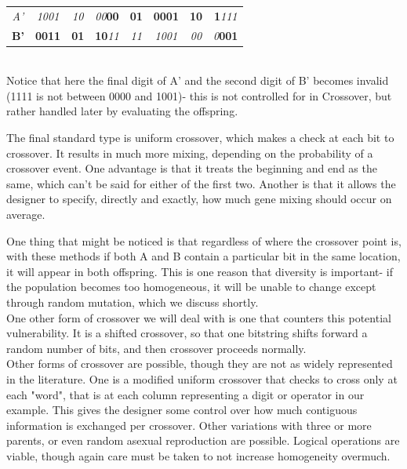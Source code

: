 \begin{tabular}{|c|c|c|c|c|c|c|c|}
	\hline
	\textit{A'} & \textit{1001} & \textit{10} & \textit{00}\textbf{00}  & \textbf{01} & \textbf{0001} & \textbf{10} & \textbf{1}\textit{111}\\ 
	\textbf{B'} & \textbf{0011} & \textbf{01} & \textbf{10}\textit{11} & \textit{11} & \textit{1001} & \textit{00} & \textit{0}\textbf{001}\\
	\hline
\end{tabular}\\

Notice that here the final digit of A' and the second digit of B' becomes invalid (1111 is not between 0000 and 1001)- this is not controlled for in Crossover, but rather handled later by evaluating the offspring.

The final standard type is uniform crossover, which makes a check at each bit to crossover.  It results in much more mixing, depending on the probability of a crossover event.  One advantage is that it treats the beginning and end as the same, which can't be said for either of the first two.  Another is that it allows the designer to specify, directly and exactly, how much gene mixing should occur on average.

One thing that might be noticed is that regardless of where the crossover point is, with these methods if both A and B contain a particular bit in the same location, it will appear in both offspring.  This is one reason that diversity is important- if the population becomes too homogeneous, it will be unable to change except through random mutation, which we discuss shortly.\\
One other form of crossover we will deal with is one that counters this potential vulnerability.  It is a shifted crossover, so that one bitstring shifts forward a random number of bits, and then crossover proceeds normally.
\\
Other forms of crossover are possible, though they are not as widely represented in the literature.  One is a modified uniform crossover that checks to cross only  at each "word", that is at each column representing a digit or operator in our example.  This gives the designer some control over how much contiguous information is exchanged per crossover.  Other variations with three or more parents, or even random asexual reproduction are possible.  Logical operations are viable, though again care must be taken to not increase homogeneity overmuch. \\

